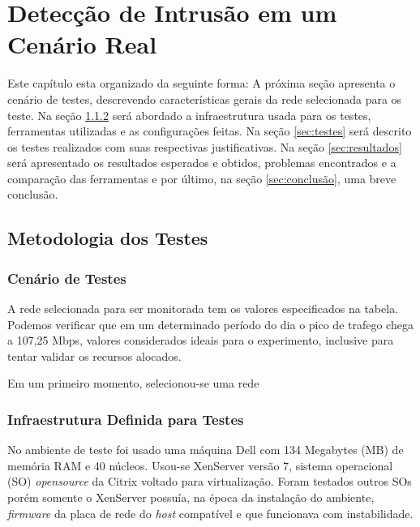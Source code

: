 \chapter{Detecção de Intrusão em um Cenário Real} \label{ch:cenário-real}

Este capítulo esta organizado da seguinte forma: A próxima seção apresenta o cenário de testes, descrevendo características gerais da rede selecionada para os teste. Na seção \ref{sec:infraestrutura} será abordado a infraestrutura usada para os testes, ferramentas utilizadas e as configurações feitas. Na seção \ref{sec:testes} será descrito os testes realizados com suas respectivas justificativas. Na seção \ref{sec:resultados} será apresentado os resultados esperados e obtidos, problemas encontrados e a comparação das ferramentas e por último, na seção \ref{sec:conclusão}, uma breve conclusão.

 \section{Metodologia dos Testes}
 \subsection{Cenário de Testes} \label{sec:cenário}

 A rede selecionada para ser monitorada tem os valores especificados na tabela. Podemos verificar que em um determinado período do dia o pico de trafego chega a 107,25 Mbps, valores considerados ideais para o experimento, inclusive para tentar validar os recursos alocados. 

 Em um primeiro momento, selecionou-se uma rede

 \subsection{Infraestrutura Definida para Testes} \label{sec:infraestrutura}

 No ambiente de teste foi usado uma máquina Dell com 134 Megabytes (MB) de memória RAM e 40 núcleos. Usou-se XenServer \cite{xenserver} versão 7, sistema operacional (SO) \textit{opensource} da Citrix voltado para virtualização. Foram testados outros SOs porém somente o XenServer possuía, na época da instalação do ambiente, \textit{firmware} da placa de rede do \textit{host} compatível e que funcionava com instabilidade. 
 
